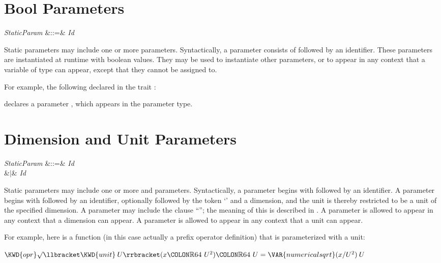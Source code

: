 \section{Bool Parameters}

\begin{Grammar}
\emph{StaticParam} &::=&  \emph{Id} \\
\end{Grammar}

Static parameters may include one or more  parameters.
Syntactically, a  parameter consists of
 followed by an identifier.
These parameters are instantiated at runtime with boolean values. They may
be used to instantiate other  parameters, or
to appear in any context that a variable of type  can appear,
except that they cannot be assigned to.


For example, the following  declared in the trait :

declares a  parameter , which appears in the parameter type.


\section{Dimension and Unit Parameters}

\begin{Grammar}
\emph{StaticParam} &::=&  \emph{Id} \\
&$|$&  \emph{Id} 
 \\
\end{Grammar}


Static parameters may include one or more  and 
parameters.  Syntactically, a  parameter begins with
 followed by an identifier.
A  parameter begins with 
followed by an identifier, optionally followed by the token `\EXP{\COLONOP}'
and a dimension, and the unit is thereby restricted to be a unit of
the specified dimension.
A  parameter may include the clause
``''; the meaning of this is described
in .
A  parameter is allowed to appear in any context that a
dimension can appear.
A  parameter is allowed to appear in any context that a unit
can appear.


For example, here is a function (in this case actually a prefix operator definition) that is parameterized with a unit:
\begin{Fortress}
\(\KWD{opr} \mathord{\surd}\llbracket\KWD{unit}\:U\rrbracket(x\COLON \mathbb{R}64\ U^{2})\COLON \mathbb{R}64\ U = \VAR{numericalsqrt}(x/U^{2})\:U\)
\end{Fortress}


